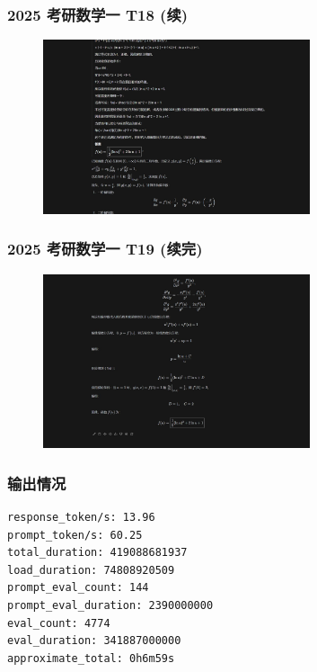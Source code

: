 \begin{frame}
    \frametitle{2025 考研数学一 T18 (续)}
    \begin{figure}
        \centering
        \includegraphics[width=0.7\textwidth]{./pic/15.png} %
        \label{fig:kaoyan_solution_7}
    \end{figure}
\end{frame}


\begin{frame}
    \frametitle{2025 考研数学一 T19 (续完)}
    \begin{figure}
        \centering
        \includegraphics[width=0.7\textwidth]{./pic/16.png} %
        \label{fig:kaoyan_solution_7}
    \end{figure}
\end{frame}

\begin{frame}[fragile]
    \frametitle{输出情况}
    \begin{lstlisting}[language=text, caption={2025 考研数学一 T18生成情况}]
response_token/s: 13.96
prompt_token/s: 60.25
total_duration: 419088681937
load_duration: 74808920509
prompt_eval_count: 144
prompt_eval_duration: 2390000000
eval_count: 4774
eval_duration: 341887000000
approximate_total: 0h6m59s
\end{lstlisting}
\end{frame}